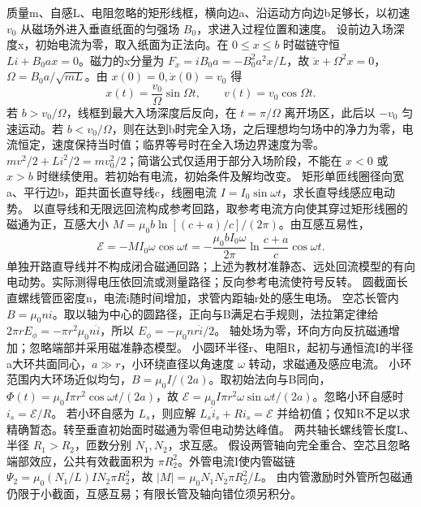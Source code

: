\problemtext 质量m、自感L、电阻忽略的矩形线框，横向边a、沿运动方向边b足够长，以初速 $v_0$ 从磁场外进入垂直纸面的匀强场 $B_0$，求进入过程位置和速度。
\workings 设前边入场深度x，初始电流为零，取入纸面为正法向。在 $0\le x\le b$ 时磁链守恒 $Li+B_0ax=0$。磁力的x分量为 $F_x=i B_0a=-B_0^2a^2x/L$，故 $\ddot x+\Omega^2x=0$，$\Omega=B_0a/\sqrt{mL}$。由 $x(0)=0,\dot x(0)=v_0$ 得
\[
x(t)=\frac{v_0}{\Omega}\sin\Omega t,\qquad v(t)=v_0\cos\Omega t.
\]
若 $b>v_0/\Omega$，线框到最大入场深度后反向，在 $t=\pi/\Omega$ 离开场区，此后以 $-v_0$ 匀速运动。若 $b<v_0/\Omega$，则在达到b时完全入场，之后理想均匀场中的净力为零，电流恒定，速度保持当时值；临界等号时在全入场边界速度为零。
\crosscheck $mv^2/2+Li^2/2=mv_0^2/2$；简谐公式仅适用于部分入场阶段，不能在 $x<0$ 或 $x>b$ 时继续使用。若初始有电流，初始条件及解均改变。
\problemtext 矩形单匝线圈径向宽a、平行边b，距共面长直导线c，线圈电流 $I=I_0\sin\omega t$，求长直导线感应电动势。
\workings 以直导线和无限远回流构成参考回路，取参考电流方向使其穿过矩形线圈的磁通为正，互感大小 $M=\mu_0b\ln[(c+a)/c]/(2\pi)$。由互感互易性，
\[
\mathcal E=-M I_0\omega\cos\omega t
=-\frac{\mu_0bI_0\omega}{2\pi}\ln\frac{c+a}{c}\cos\omega t.
\]
\crosscheck 单独开路直导线并不构成闭合磁通回路；上述为教材准静态、远处回流模型的有向电动势。实际测得电压依回流或测量路径；反向参考电流使符号反转。
\problemtext 圆截面长直螺线管匝密度n，电流i随时间增加，求管内距轴r处的感生电场。
\workings 空芯长管内 $B=\mu_0ni$。取以轴为中心的圆路径，正向与B满足右手规则，法拉第定律给 $2\pi rE_\phi=-\pi r^2\mu_0n\dot i$，所以 $E_\phi=-\mu_0nr\dot i/2$。
\crosscheck 轴处场为零，环向方向反抗磁通增加；忽略端部并采用磁准静态模型。
\problemtext 小圆环半径r、电阻R，起初与通恒流I的半径a大环共面同心，$a\gg r$，小环绕直径以角速度 $\omega$ 转动，求磁通及感应电流。
\workings 小环范围内大环场近似均匀，$B=\mu_0I/(2a)$。取初始法向与B同向，$\Phi(t)=\mu_0I\pi r^2\cos\omega t/(2a)$，故 $\mathcal E=\mu_0I\pi r^2\omega\sin\omega t/(2a)$。忽略小环自感时 $i_s=\mathcal E/R$。
\crosscheck 若小环自感为 $L_s$，则应解 $L_s\dot i_s+Ri_s=\mathcal E$ 并给初值；仅知R不足以求精确暂态。转至垂直初始面时磁通为零但电动势达峰值。
\problemtext 两共轴长螺线管长度L、半径 $R_1>R_2$，匝数分别 $N_1,N_2$，求互感。
\workings 假设两管轴向完全重合、空芯且忽略端部效应，公共有效截面积为 $\pi R_2^2$。外管电流I使内管磁链 $\Psi_2=\mu_0(N_1/L)I N_2\pi R_2^2$，故 $|M|=\mu_0N_1N_2\pi R_2^2/L$。
\crosscheck 由内管激励时外管所包磁通仍限于小截面，互感互易；有限长管及轴向错位须另积分。
